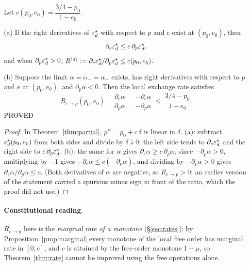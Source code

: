 \begin{theorem}\label{thm:rate}
Let $c(p_0,e_0)=\dfrac{3/4-p_0}{1-e_0}$.

(a) If the right derivatives of $\varepsilon^{\star}_d$ with respect to $p$ and $e$ exist at $(p_0,e_0)$, then
\[\partial_e\varepsilon^{\star}_d\le c\,\partial_p\varepsilon^{\star}_d,\]
and when $\partial_p\varepsilon^{\star}_d>0$, $R^{(d)}:=\partial_e\varepsilon^{\star}_d/\partial_p\varepsilon^{\star}_d\le c(p_0,e_0)$.

(b) Suppose the limit $\alpha=\alpha_-=\alpha_+$ exists, has right derivatives with respect to $p$ and $e$ at $(p_0,e_0)$, and $\partial_p\alpha<0$. Then the local exchange rate satisfies
\[
R_{e\to p}(p_0,e_0)=\frac{\partial_e\alpha}{\partial_p\alpha}=\frac{-\partial_e\alpha}{-\partial_p\alpha}\;\le\;\frac{3/4-p_0}{1-e_0}.
\]
\hfill\st{PROVED}
\end{theorem}
\begin{proof}
In Theorem~\ref{thm:partial}, $p''=p_0+c\,\delta$ is linear in $\delta$. (a): subtract $\varepsilon^{\star}_d(p_0,e_0)$ from both sides and divide by $\delta\downarrow0$;
the left side tends to $\partial_e\varepsilon^{\star}_d$ and the right side to $c\,\partial_p\varepsilon^{\star}_d$. (b): the same for $\alpha$ gives
$\partial_e\alpha\ge c\,\partial_p\alpha$; since $-\partial_p\alpha>0$, multiplying by $-1$ gives
$-\partial_e\alpha\le c(-\partial_p\alpha)$, and dividing by $-\partial_p\alpha>0$ gives $\partial_e\alpha/\partial_p\alpha\le c$. (Both derivatives of $\alpha$ are negative, so $R_{e\to p}>0$; an earlier version of the statement carried a spurious minus sign in front of the ratio, which the proof did not use.)
\end{proof}

\paragraph{Constitutional reading.}
$R_{e\to p}$ here is the \emph{marginal rate of a monotone} (\S\ref{sec:rates}); by Proposition~\ref{prop:marginal} every monotone of the local free order has marginal rate in $[0,c]$, and $c$ is attained by the free-order monotone $1-\mu$, so Theorem~\ref{thm:rate} cannot be improved using the free operations alone.

